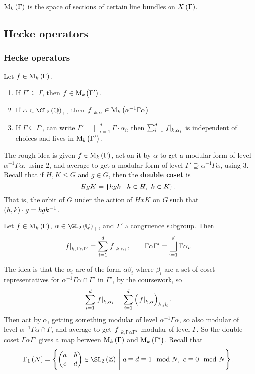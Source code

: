 $ \M_k\br{\Gamma} $ is the space of sections of certain line bundles on $ X\br{\Gamma} $.

\pagebreak

\subsection{Hecke operators}

\subsubsection{Hecke operators}


Let $ f \in \M_k\br{\Gamma} $.
\begin{enumerate}
\item If $ \Gamma' \subseteq \Gamma $, then $ f \in \M_k\br{\Gamma'} $.
\item If $ \alpha \in \GL_2\br{\QQ}_+ $, then $ \eval{f}_{k, \alpha} \in \M_k\br{\alpha^{-1}\Gamma\alpha} $.
\item If $ \Gamma \subseteq \Gamma' $, can write $ \Gamma' = \bigsqcup_{i = 1}^d \Gamma \cdot \alpha_i $, then $ \sum_{i = 1}^d \left. f \right|_{k, \alpha_i} $ is independent of choices and lives in $ \M_k\br{\Gamma'} $.
\end{enumerate}
The rough idea is given $ f \in \M_k\br{\Gamma} $, act on it by $ \alpha $ to get a modular form of level $ \alpha^{-1}\Gamma\alpha $, using $ 2 $, and average to get a modular form of level $ \Gamma' \supseteq \alpha^{-1}\Gamma\alpha $, using $ 3 $. Recall that if $ H, K \le G $ and $ g \in G $, then the \textbf{double coset} is
$$ HgK = \cbr{hgk \st h \in H, \ k \in K}. $$
That is, the orbit of $ G $ under the action of $ HxK $ on $ G $ such that $ \br{h, k} \cdot g = hgk^{-1} $.

\begin{definition}
Let $ f \in \M_k\br{\Gamma} $, $ \alpha \in \GL_2\br{\QQ}_+ $, and $ \Gamma' $ a congruence subgroup. Then
$$ \left. f \right|_{k, \Gamma\alpha\Gamma'} = \sum_{i = 1}^d \left. f \right|_{k, \alpha_i}, \qquad \Gamma\alpha\Gamma' = \bigsqcup_{i = 1}^d \Gamma\alpha_i. $$
\end{definition}

The idea is that the $ \alpha_i $ are of the form $ \alpha\beta_i $ where $ \beta_i $ are a set of coset representatives for $ \alpha^{-1}\Gamma\alpha \cap \Gamma' $ in $ \Gamma' $, by the coursework, so
$$ \sum_{i = 1}^d \eval{f}_{k, \alpha_i} = \sum_{i = 1}^d \br{\eval{f}_{k, \alpha}}_{k, \beta_i}. $$
Then act by $ \alpha $, getting something modular of level $ \alpha^{-1}\Gamma\alpha $, so also modular of level $ \alpha^{-1}\Gamma\alpha \cap \Gamma $, and average to get $ \left. f \right|_{k, \Gamma\alpha\Gamma'} $ modular of level $ \Gamma $. So the double coset $ \Gamma\alpha\Gamma' $ gives a map between $ \M_k\br{\Gamma} $ and $ \M_k\br{\Gamma'} $. Recall that
$$ \Gamma_1\br{N} = \cbr{\twobytwo{a}{b}{c}{d} \in \SL_2\br{\ZZ} \st a \equiv d \equiv 1 \mod N, \ c \equiv 0 \mod N}. $$

